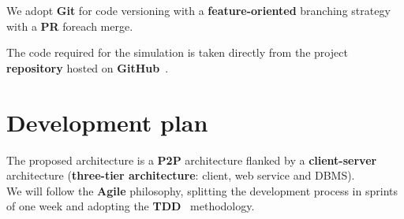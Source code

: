 We adopt \textbf{Git} for code versioning with a \textbf{feature-oriented} 
branching strategy with a \textbf{PR} foreach merge.

The code required for the simulation is taken directly from the project 
\textbf{repository} hosted on \textbf{GitHub}~\cite{2}.


\section{Development plan}

The proposed architecture is a \textbf{P2P} architecture flanked by a 
\textbf{client-server} architecture (\textbf{three-tier architecture}: 
client, web service and DBMS).\\

We will follow the \textbf{Agile} philosophy, splitting the development process in sprints 
of one week and adopting the \textbf{TDD}~\cite{10} methodology.